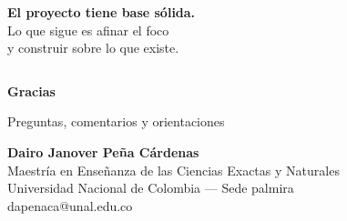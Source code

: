 \documentclass[11pt, aspectratio=169, spanish]{beamer}
\begin{document}
\begin{frame}[plain]
\begin{columns}[T]
\vspace{0.05cm}

\begin{tcolorbox}[colback=VerdeUNAL!8, colframe=VerdeUNAL!60, arc=2mm, nobeforeafter, top=3pt, bottom=3pt]
\centering
{\normalsize\textcolor{VerdeUNAL}{\textbf{El proyecto tiene base sólida.}}}\\[0.06cm]
{\small Lo que sigue es afinar el foco\\
y construir sobre lo que existe.}
\end{tcolorbox}

\end{columns}
\end{frame}

\begin{frame}[plain]
\vspace*{1.4cm}
\begin{center}
{\Huge\textcolor{VerdeUNAL}{\textbf{Gracias}}}

\vspace{0.5cm}
{\large Preguntas, comentarios y orientaciones}

\vspace{0.5cm}

\begin{tcolorbox}[colback=VerdeUNAL!6, colframe=VerdeUNAL!50, arc=3mm,
  width=0.60\textwidth, halign=center]
{\small\textbf{Dairo Janover Peña Cárdenas}\\[0.05cm]
\footnotesize Maestría en Enseñanza de las Ciencias Exactas y Naturales\\
Universidad Nacional de Colombia — Sede palmira\\[0.1cm]
\textcolor{VerdeUNAL}{\faEnvelope\; dapenaca@unal.edu.co}}
\end{tcolorbox}

\vspace{0.4cm}
{\large\textcolor{VerdeUNAL}{\faSeedling\quad\faSeedling\quad\faSeedling}}
\end{center}
\end{frame}
\end{document}
